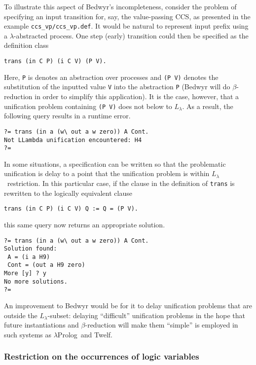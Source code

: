 \documentclass{article}
\newcommand{\lp}{$\lambda$Prolog}
\newcommand{\Ll}{$L_\lambda$}
\begin{document}
To illustrate this aspect of Bedwyr's incompleteness, consider the
problem of specifying an input transition for, say, the value-passing
CCS, as presented in the example \verb+ccs_vp/ccs_vp.def+.  It would
be natural to represent input prefix using a $\lambda$-abstracted
process.  One step (early) transition could then be specified as the
definition class
\begin{verbatim}
trans (in C P) (i C V) (P V).
\end{verbatim}
Here, {\tt P} is denotes an abstraction over processes and
\verb+(P V)+ denotes the substitution of the inputted value {\tt V}
into the abstraction {\tt P} (Bedwyr will do $\beta$-reduction in order
to simplify this application).  It is the case, however, that a
unification problem containing \verb+(P V)+ does not below to \Ll.
As a result, the following query results in a runtime error.
\begin{verbatim}
?= trans (in a (w\ out a w zero)) A Cont.
Not LLambda unification encountered: H4
?= 
\end{verbatim}
In some situations, a specification can be written so that the
problematic unification is delay to a point that the unification
problem is within \Ll\ restriction.  In this particular case, if the clause
in the definition of {\tt trans} is rewritten to the logically
equivalent clause
\begin{verbatim}
trans (in C P) (i C V) Q := Q = (P V).
\end{verbatim}
this same query now returns an appropriate solution.
\begin{verbatim}
?= trans (in a (w\ out a w zero)) A Cont.
Solution found:
 A = (i a H9)
 Cont = (out a H9 zero)
More [y] ? y
No more solutions.
?= 
\end{verbatim}
An improvement to Bedwyr would be for it to delay unification problems
that are outside the \Ll-subset: delaying ``difficult'' unification
problems in the hope that future instantiations and $\beta$-reduction
will make them ``simple'' is employed in such systems as \lp\ and
Twelf.

\subsubsection{Restriction on the occurrences of logic variables}
\label{restrict-logic-variables}
\end{document}
